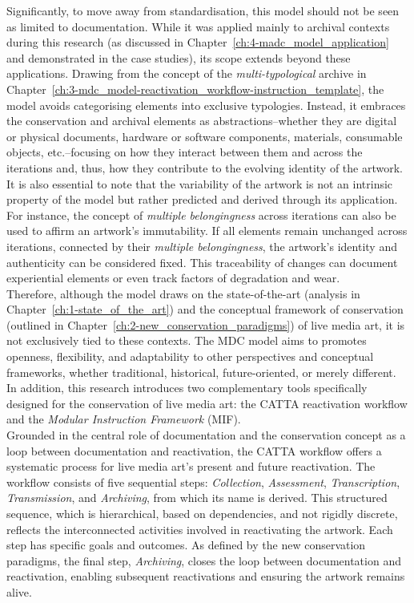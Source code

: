 Significantly, to move away from standardisation, this model should not be seen as limited to documentation. While it was applied mainly to archival contexts during this research (as discussed in Chapter~\ref{ch:4-madc_model_application} and demonstrated in the case studies), its scope extends beyond these applications. Drawing from the concept of the \textit{multi-typological} archive in Chapter~\ref{ch:3-mdc_model-reactivation_workflow-instruction_template}, the model avoids categorising elements into exclusive typologies. Instead, it embraces the conservation and archival elements as abstractions–whether they are digital or physical documents, hardware or software components, materials, consumable objects, etc.–focusing on how they interact between them and across the iterations and, thus, how they contribute to the evolving identity of the artwork.\\
It is also essential to note that the variability of the artwork is not an intrinsic property of the model but rather predicted and derived through its application. For instance, the concept of \textit{multiple belongingness} across iterations can also be used to affirm an artwork's immutability. If all elements remain unchanged across iterations, connected by their \textit{multiple belongingness}, the artwork's identity and authenticity can be considered fixed. This traceability of changes can document experiential elements or even track factors of degradation and wear.\\
Therefore, although the model draws on the state-of-the-art (analysis in Chapter~\ref{ch:1-state_of_the_art}) and the conceptual framework of conservation (outlined in Chapter~\ref{ch:2-new_conservation_paradigms}) of live media art, it is not exclusively tied to these contexts. The MDC model aims to promotes openness, flexibility, and adaptability to other perspectives and conceptual frameworks, whether traditional, historical, future-oriented, or merely different.\\
In addition, this research introduces two complementary tools specifically designed for the conservation of live media art: the CATTA reactivation workflow and the \textit{Modular Instruction Framework} (MIF).\\
Grounded in the central role of documentation and the conservation concept as a loop between documentation and reactivation, the CATTA workflow offers a systematic process for live media art's present and future reactivation. The workflow consists of five sequential steps: \textit{Collection}, \textit{Assessment}, \textit{Transcription}, \textit{Transmission}, and \textit{Archiving}, from which its name is derived. This structured sequence, which is hierarchical, based on dependencies, and not rigidly discrete, reflects the interconnected activities involved in reactivating the artwork. Each step has specific goals and outcomes. As defined by the new conservation paradigms, the final step, \textit{Archiving}, closes the loop between documentation and reactivation, enabling subsequent reactivations and ensuring the artwork remains alive.\\
